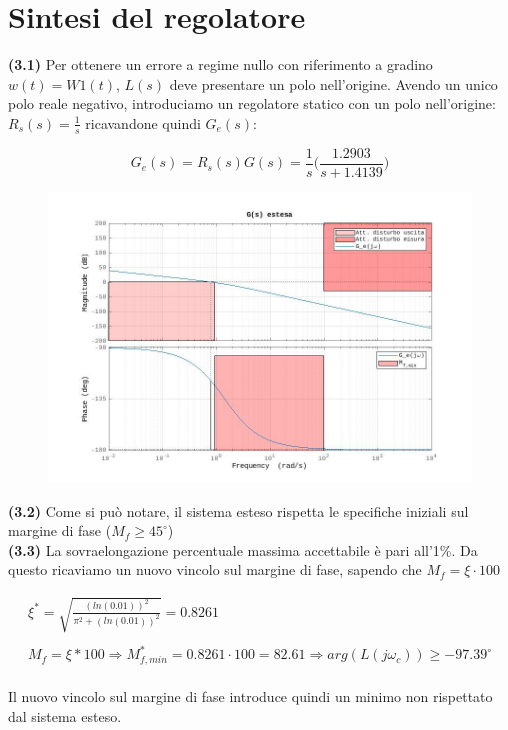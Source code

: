 \documentclass[a4paper,12pt,italian]{article}
\begin{document}
\newpage

\section{Sintesi del regolatore}

\textbf{(3.1)} Per ottenere un errore a regime nullo con riferimento a gradino $w(t) = W1(t)$, $L(s)$ deve presentare un polo nell'origine.
Avendo un unico polo reale negativo, introduciamo un regolatore statico con un polo nell'origine: $ R_s(s) = \frac{1}{s} $ ricavandone quindi $ G_e(s) $:

\begin{equation*}
    G_e(s) = R_s(s)G(s) = \frac{1}{s}\Big(\frac{1.2903}{s + 1.4139}\Big)
\end{equation*}

\begin{figure}[h!]
    \begin{center}
        \includegraphics[scale=0.5]{img/bode_GG_estesa.jpg}
    \end{center}    
\end{figure}

\textbf{(3.2)} Come si può notare, il sistema esteso rispetta le specifiche iniziali sul margine di fase ($ M_f \geq 45^\circ$)\\

\textbf{(3.3)} La sovraelongazione percentuale massima accettabile è pari all'1\%. 
Da questo ricaviamo un nuovo vincolo sul margine di fase, sapendo che $M_f = \xi \cdot 100 $

\begin{equation*}
    \begin{array}{c}
        \xi^* = \sqrt{\frac{(ln(0.01))^2}{\pi^2+(ln(0.01))^2}} = 0.8261\\ \\
        M_f=\xi * 100 \Longrightarrow M^*_{f,min}=0.8261 \cdot 100 = 82.61
        \Longrightarrow arg(L(j\omega_c)) \geq -97.39^\circ
    \end{array}
\end{equation*}\\
Il nuovo vincolo sul margine di fase introduce quindi un minimo non rispettato dal sistema esteso.\\
\end{document}

